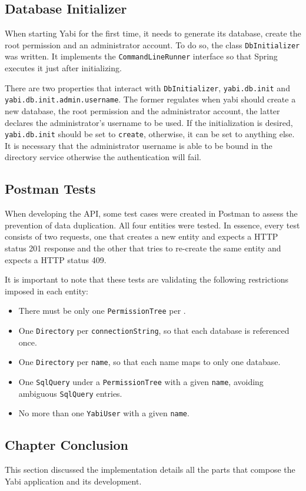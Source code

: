 \subsection{Database Initializer}
When starting \gls{Yabi} for the first time, it needs to generate its database, create the root permission and an administrator account.
To do so, the class \texttt{DbInitializer} was written. It implements the \texttt{CommandLineRunner} interface so that Spring executes it just after initializing.

There are two properties that interact with \texttt{DbInitializer}, \texttt{yabi.db.init} and \texttt{yabi.db.init.admin.username}. The former regulates when yabi should create a new database, the root permission and the administrator account, the latter declares the administrator's username to be used. If the initialization is desired, \texttt{yabi.db.init} should be set to \texttt{create}, otherwise, it can be set to anything else. It is necessary that the administrator username is able to be bound in the directory service otherwise the authentication will fail.

\subsection{Postman Tests}
When developing the \gls{API}, some test cases were created in Postman to assess the prevention of data duplication. All four entities were tested.
In essence, every test consists of two requests, one that creates a new entity and expects a \gls{HTTP} status 201 response and the other that tries to re-create the same entity and expects a \gls{HTTP} status 409.

It is important to note that these tests are validating the following restrictions imposed in each entity:
\begin{itemize}
\item There must be only one \texttt{PermissionTree} per .
\item One \texttt{Directory} per \texttt{connectionString}, so that each database is referenced once.
\item One \texttt{Directory} per \texttt{name}, so that each name maps to only one database.
\item One \texttt{SqlQuery} under a \texttt{PermissionTree} with a given \texttt{name}, avoiding ambiguous \texttt{SqlQuery} entries.
\item No more than one \texttt{YabiUser} with a given \texttt{name}.
\end{itemize}

\subsection{Chapter Conclusion}
This section discussed the implementation details all the parts that compose the \gls{Yabi} application and its development.



